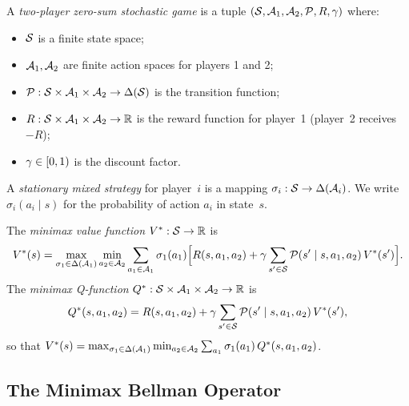 \documentclass[11pt,a4paper]{article}
\begin{document}
\begin{definition}
\label{def:zerosum-sg}
A \emph{two-player zero-sum stochastic game} is a tuple
$(\mathcal{S}, \mathcal{A}_1, \mathcal{A}_2, \mathcal{P}, R, \gamma)$ where:
\begin{itemize}
  \item $\mathcal{S}$ is a finite state space;
  \item $\mathcal{A}_1, \mathcal{A}_2$ are finite action spaces for players 1
    and 2;
  \item $\mathcal{P} : \mathcal{S} \times \mathcal{A}_1 \times \mathcal{A}_2
    \to \Delta(\mathcal{S})$ is the transition function;
  \item $R : \mathcal{S} \times \mathcal{A}_1 \times \mathcal{A}_2 \to \mathbb{R}$ is the
    reward function for player~1 (player~2 receives $-R$);
  \item $\gamma \in [0,1)$ is the discount factor.
\end{itemize}
\end{definition}

A \emph{stationary mixed strategy} for player~$i$ is a mapping
$\sigma_i : \mathcal{S} \to \Delta(\mathcal{A}_i)$.  We write
$\sigma_i(a_i \mid s)$ for the probability of action $a_i$ in state~$s$.

\begin{definition}
\label{def:minimax-value}
The \emph{minimax value function} $V^* : \mathcal{S} \to \mathbb{R}$ is
\begin{equation}
\label{eq:minimax-value}
  V^*(s)
  = \max_{\sigma_1 \in \Delta(\mathcal{A}_1)}
    \min_{a_2 \in \mathcal{A}_2}
    \sum_{a_1 \in \mathcal{A}_1} \sigma_1(a_1)
    \Bigl[ R(s, a_1, a_2)
    + \gamma \sum_{s' \in \mathcal{S}} \mathcal{P}(s' \mid s, a_1, a_2)\,
      V^*(s') \Bigr].
\end{equation}
The \emph{minimax Q-function} $Q^* : \mathcal{S} \times \mathcal{A}_1 \times
\mathcal{A}_2 \to \mathbb{R}$ is
\begin{equation}
\label{eq:minimax-Q}
  Q^*(s, a_1, a_2)
  = R(s, a_1, a_2)
  + \gamma \sum_{s' \in \mathcal{S}} \mathcal{P}(s' \mid s, a_1, a_2)\,
    V^*(s'),
\end{equation}
so that $V^*(s) = \max_{\sigma_1 \in \Delta(\mathcal{A}_1)}
\min_{a_2 \in \mathcal{A}_2} \sum_{a_1} \sigma_1(a_1)\, Q^*(s, a_1, a_2)$.
\end{definition}

\subsection{The Minimax Bellman Operator}
\end{document}
